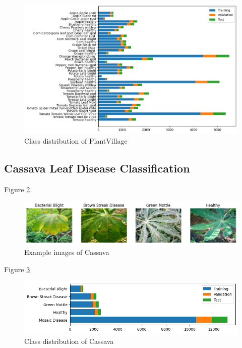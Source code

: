\begin{figure}[H]
    \begin{center}
    \includegraphics[width=15cm]{../images/class_distribution_of_plantvillage.png}
    \caption{Class distribution of PlantVillage}
    \label{fig:class_distribution_of_plantvillage}
    \end{center}
\end{figure}

\subsection{Cassava Leaf Disease Classification}
Figure \ref{fig:example_images_of_cassava}.

\begin{figure}[H]
    \begin{center}
    \includegraphics[width=15cm]{../images/example_images_of_cassava.png}
    \caption{Example images of Cassava}
    \label{fig:example_images_of_cassava}
    \end{center}
\end{figure}

Figure \ref{fig:class_distribution_of_cassava}

\begin{figure}[H]
    \begin{center}
    \includegraphics[width=15cm]{../images/class_distribution_of_cassava.png}
    \caption{Class distribution of Cassava}
    \label{fig:class_distribution_of_cassava}
    \end{center}
\end{figure}


